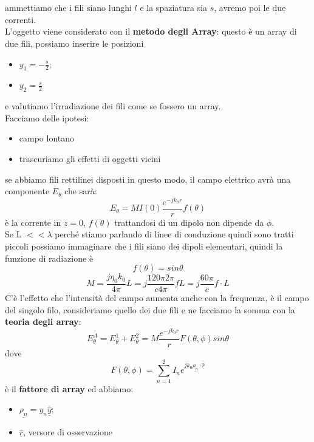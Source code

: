 \documentclass[oneside, 12pt]{extbook}
\begin{document}
\\\\ammettiamo che i fili siano lunghi $l$ e la spaziatura sia $s$, avremo poi le due correnti.\\L'oggetto viene considerato con il \textbf{metodo degli Array}: questo è un array di due fili, possiamo inserire le posizioni 
\begin{itemize}
	\item $y_1 = -\frac{s}{2}$;
	\item $y_2 = \frac{s}{2}$	
\end{itemize}
e valutiamo l'irradiazione dei fili come se fossero un array.\\Facciamo delle ipotesi:
\begin{itemize}
	\item campo lontano
	\item trascuriamo gli effetti di oggetti vicini
\end{itemize}
se abbiamo fili rettilinei disposti in questo modo, il campo elettrico avrà una componente $E_{\theta}$ che sarà:
\begin{equation}
	E_{\theta} = M I(0) \frac{e^{-jk_0 r}}{r} f(\theta)	
\end{equation}
è la corrente in $z = 0$, $f(\theta)$ trattandosi di un dipolo non dipende da $\phi$.\\Se L $<< \lambda$ perché stiamo parlando di linee di conduzione quindi sono tratti piccoli possiamo immaginare che i fili siano dei dipoli elementari, quindi la funzione di radiazione è 
\begin{equation}
	f(\theta) = sin \theta	
\end{equation}
\begin{equation}
	M = \frac{j \eta_0 k_0}{4 \pi} L = j\frac{120\pi 2\pi}{c 4 \pi} fL = j\frac{60 \pi}{c } f \cdot L
\end{equation}
C'è l'effetto che l'intensità del campo aumenta anche con la frequenza, è il campo del singolo filo, consideriamo quello dei due fili e ne facciamo la somma con la \textbf{teoria degli array}:
\begin{equation}
	E_{\theta}^A = E_{\theta}^1 + E_{\theta}^2 = M \frac{e^{-jk_0 r}}{r} F(\theta, \phi) sin \theta	
\end{equation}
dove 
\begin{equation}
	F(\theta, \phi) = \sum\limits_{n=1}^{2} I_n e^{jk_0 \underline{\rho_n}\cdot \hat{\underline{r}}}
\end{equation}
è il \textbf{fattore di array} ed abbiamo:
\begin{itemize}
	\item $\underline{\rho_n} = y_n\underline{\hat{y}}$;
	\item $\underline{\hat{r}}$, versore di osservazione
\end{itemize}
\end{document}
